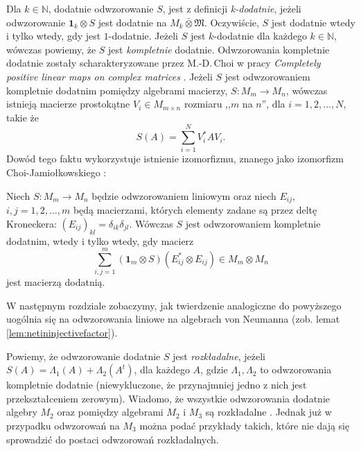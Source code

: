 Dla $k \in \mathbb{N}$, dodatnie odwzorowanie $S$,
jest z definicji \emph{k-dodatnie}, jeżeli
odwzorowanie
$\mathbf{1}_{k} \otimes S$
jest dodatnie na $M_{k} \bar{\otimes} \mathfrak{M}$.
Oczywiście, $S$ jest dodatnie wtedy i tylko wtedy, gdy jest $1$-dodatnie.
Jeżeli $S$ jest $k$-dodatnie dla każdego $k \in \mathbb{N}$,
wówczas powiemy, że $S$ jest \emph{kompletnie} dodatnie.
Odwzorowania kompletnie dodatnie zostały scharakteryzowane przez M.-D.\,Choi
w pracy \emph{Completely positive linear maps on complex matrices}
\cite{choi1975completely}.
Jeżeli $S$ jest odwzorowaniem kompletnie dodatnim pomiędzy algebrami macierzy,
$S: M_{m} \rightarrow M_{n}$, wówczas istnieją macierze prostokątne
$V_{i} \in M_{m \times n}$ rozmiaru ,,$m$ na $n$'', dla $i = 1,2,\ldots,N$,
takie że
\begin{equation}
    S(A) = \sum \limits_{i = 1}^{N} V_{i}^{*} A V_{i}.
\end{equation}
Dowód tego faktu wykorzystuje istnienie izomorfizmu,
znanego jako izomorfizm Choi-Jamiołkowskiego
\cite{choi1975completely, jamiolkowski1974effective}:
\begin{Theorem}
    Niech $S: M_{m} \rightarrow M_{n}$ będzie odwzorowaniem liniowym
    oraz niech $E_{ij}$, $i,j = 1,2,\ldots,m$ będą macierzami, których
    elementy zadane są przez deltę Kroneckera:
    $(E_{ij})_{kl} = \delta_{ik} \delta_{jl}$.
    Wówczas $S$ jest odwzorowaniem kompletnie dodatnim,
    wtedy i tylko wtedy, gdy macierz
    \begin{equation}
        \sum \limits_{i,j=1}^{m} (\mathbf{1}_{m} \otimes S)
            (E_{ij}^{*} \otimes E_{ij}) \in M_{m} \otimes M_{n}
    \end{equation}
    jest macierzą dodatnią.
\end{Theorem}
W następnym rozdziale zobaczymy, jak twierdzenie analogiczne do powyższego
uogólnia się na odwzorowania liniowe na algebrach von Neumanna
(zob. lemat \ref{lem:netininjectivefactor}).

Powiemy, że odwzorowanie dodatnie $S$ jest \emph{rozkładalne}, jeżeli
 $S(A) = \Lambda_{1}(A) + \Lambda_{2} (A^{t})$,
 dla każdego $A$,
gdzie $\Lambda_{1}, \Lambda_{2}$ to odwzorowania kompletnie dodatnie
(niewykluczone, że przynajmniej jedno z nich jest przekształceniem zerowym).
Wiadomo, że wszystkie odwzorowania dodatnie algebry $M_{2}$
oraz pomiędzy algebrami $M_{2}$ i $M_{3}$ są rozkładalne
\cite{Stormer2013}.
Jednak już w przypadku odwzorowań na $M_{3}$ można podać przykłady takich,
które nie dają się sprowadzić do postaci odwzorowań rozkładalnych.

